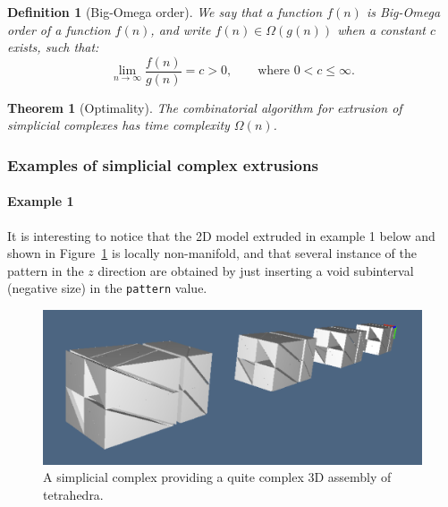 \documentclass[11pt,oneside]{article}	%
\newtheorem{definition}{Definition}
\newtheorem{theorem}{Theorem}
\begin{document}
\begin{definition}[Big-Omega order]
We say that a function $f(n)$ is \emph{Big-Omega} order of a function $f(n)$, and write 
$f(n) \in \Omega(g(n))$ when a constant $c$ exists, such that:
\[
\lim_{n\to\infty} \frac{f(n)}{g(n)}=c>0,\qquad \mbox{where\ } 0<c\leq\infty.
\]
\end{definition}



\begin{theorem}[Optimality]
The combinatorial algorithm for extrusion of simplicial complexes has time complexity $\Omega(n)$.
\end{theorem}

\subsubsection{Examples of simplicial complex extrusions}

\paragraph{Example 1}
It is interesting to notice that the 2D model extruded in example 1 below and shown in Figure~\ref{fig:assembly} is locally non-manifold, and that several instance of the pattern in the $z$ direction are obtained by just inserting a void subinterval (negative size) in the \texttt{pattern} value.

\begin{figure}[htbp] %
   \centering
   \includegraphics[width=0.7\linewidth]{images/assembly} 
   \caption{A simplicial complex providing a quite complex 3D assembly of tetrahedra.}
   \label{fig:assembly}
\end{figure}
\end{document}
